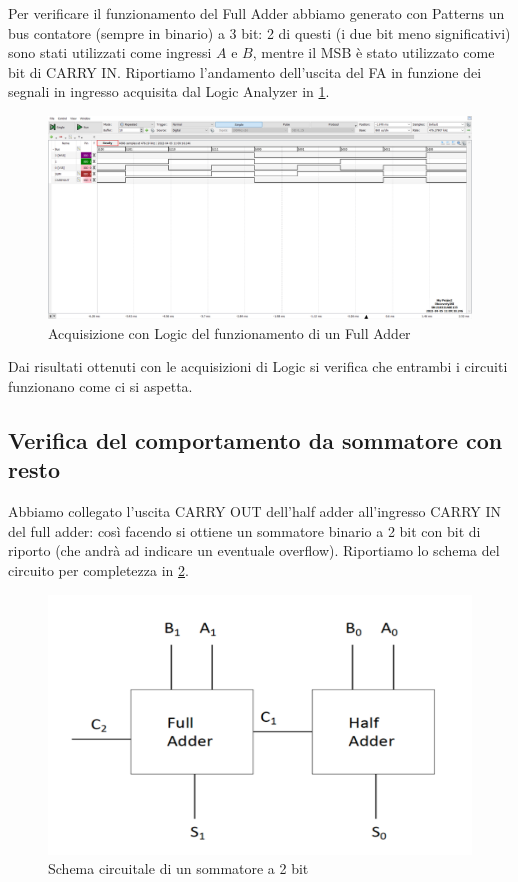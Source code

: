 \documentclass[10pt, a4paper, italian]{article}
\begin{document}
Per verificare il funzionamento del Full Adder abbiamo generato con Patterns
un bus contatore (sempre in binario) a 3 bit: 2 di questi (i due bit meno
significativi) sono stati utilizzati come ingressi $A$ e $B$, mentre il MSB è
stato utilizzato come bit di CARRY IN. Riportiamo l'andamento dell'uscita del
FA in funzione dei segnali in ingresso acquisita dal Logic Analyzer in
\cref{fig: FA_log}.
\begin{figure}[htbp]
	\centering
	\includegraphics[width=\textwidth]{full_time}
	\caption{Acquisizione con Logic del funzionamento di un Full Adder
	\label{fig: FA_log}}
\end{figure} 
Dai risultati ottenuti con le acquisizioni di Logic si verifica che entrambi
i circuiti funzionano come ci si aspetta.

\subsection{Verifica del comportamento da sommatore con resto}
Abbiamo collegato l'uscita CARRY OUT dell'half adder all'ingresso CARRY IN
del full adder: così facendo si ottiene un sommatore binario a 2 bit con bit
di riporto (che andrà ad indicare un eventuale overflow). Riportiamo lo schema
del circuito per completezza in \cref{fig: sommatore}.
\begin{figure}[htbp]
    \centering
    \includegraphics[width=0.6\linewidth]{sum.png}
    \caption{Schema circuitale di un sommatore a 2 bit}
    \label{fig: sommatore}
\end{figure}
\end{document}
